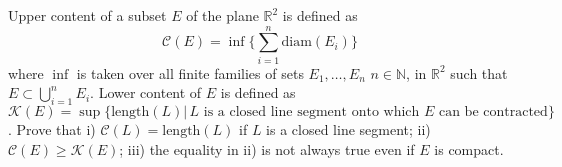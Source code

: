 Upper content of a subset $E$ of the plane $\mathbb{R}^{2}$ is defined as
$$\mathcal{C}(E)=\inf\{\sum_{i=1}^{n} \text{diam}(E_{i})\}$$where $\inf$ is taken over all finite families of sets $E_{1},\dots,E_{n}$ $n\in \mathbb{N}$, in $\mathbb{R}^{2}$
such that $E\subset \bigcup_{i=1}^{n}E_{i}$.
Lower content of $E$ is defined as
$$\mathcal{K}(E)=\sup\{\text{length}(L) |\, L \text{ is a closed line segment onto which $E$ can be contracted}\}$$.
Prove that
i) $\mathcal{C}(L)=\text{length}(L)$ if $L$ is a closed line segment;
ii) $\mathcal{C}(E) \geq \mathcal{K}(E)$;
iii) the equality in ii) is not always true even if $E$ is compact.